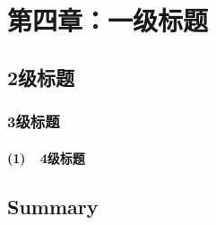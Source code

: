  \setlength{\baselineskip}{20pt}
\chapter{第四章：一级标题}
\label{cha:chap4}



\section{2级标题}


\subsection{3级标题}

\subsubsection{(1)~~4级标题}

\section{Summary}
